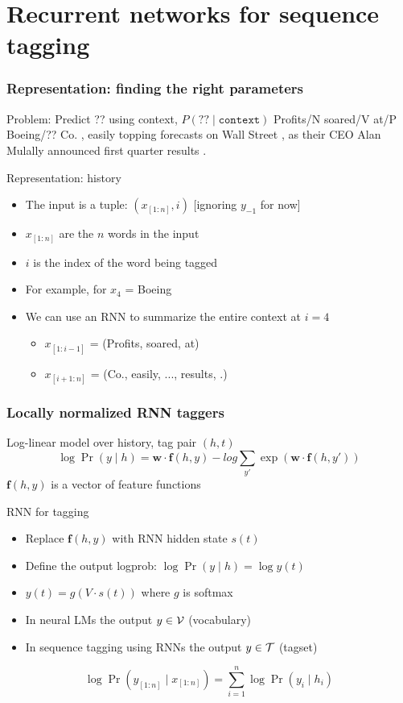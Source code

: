 \newcommand{\postag}[1]{{\color{red}/#1}}
\newcommand{\nertag}[1]{{\color{blue}/#1}}

\section{Recurrent networks for sequence tagging}

\begin{frame}
\frametitle{Representation: finding the right parameters}
\begin{block}{Problem: Predict ?? using context, $P(?? \mid \texttt{context})$ }
Profits\postag{N} soared\postag{V} at\postag{P} Boeing\postag{??} Co. , easily topping forecasts on Wall Street , as their CEO Alan Mulally announced first quarter results .
\end{block}
\pause
\begin{block}{Representation: history}
\begin{itemize}
\item The input is a tuple: $(x_{[1:n]}, i)$ [ignoring $y_{-1}$ for now]
\item $x_{[1:n]}$ are the $n$ words in the input
\item $i$ is the index of the word being tagged
\item For example, for $x_4$ = Boeing
\item We can use an RNN to summarize the entire context at $i=4$
    \begin{itemize}
    \item $x_{[1:i-1]}$ = (Profits, soared, at)
    \item $x_{[i+1:n]}$ = (Co., easily, ..., results, .)
    \end{itemize}
\end{itemize}
\end{block}
\end{frame}

\begin{frame}
\frametitle{Locally normalized RNN taggers}
\begin{block}{Log-linear model over history, tag pair $(h,t)$}
\[ \log \Pr(y \mid h) = \textbf{w} \cdot \textbf{f}(h, y) - log \sum_{y'} \exp \left( \textbf{w} \cdot \textbf{f}(h, y') \right) \]
\centering
$\textbf{f}(h, y)$ is a vector of feature functions
\end{block}
\pause
\begin{block}{RNN for tagging}
\begin{itemize}
\item Replace $\textbf{f}(h, y)$ with RNN hidden state $s(t)$
\item Define the output logprob: $\log \Pr(y \mid h) = \log y(t)$
\item $y(t) = g(V \cdot s(t))$ where $g$ is softmax
\item In neural LMs the output $y \in {\cal V}$ (vocabulary)
\item In sequence tagging using RNNs the output $y \in {\cal T}$ (tagset)
\end{itemize}
\[ \log \Pr( y_{[1:n]} \mid x_{[1:n]} ) = \sum_{i=1}^n \log \Pr(y_i \mid h_i) \]
\end{block}
\end{frame}

